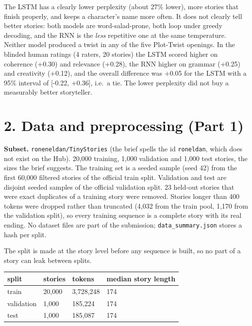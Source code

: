 \documentclass[10pt,a4paper]{article}
\begin{document}
The LSTM has a clearly lower perplexity (about 27\% lower), more stories that finish properly, and keeps a character's
name more often. It does not clearly tell better stories: both models are
word-salad-prone, both loop under greedy decoding, and the RNN is the \emph{less} repetitive one at the same temperature.
Neither model produced a twist in any of the five Plot-Twist openings. In the blinded human ratings (4 raters, 20 stories) the LSTM
scored higher on coherence (+0.30) and relevance (+0.28), the RNN higher on grammar (+0.25) and creativity (+0.12), and the overall difference was +0.05
for the LSTM with a 95\% interval of {[}-0.22, +0.36{]}, i.e.~a tie. The lower perplexity did not buy a measurably better storyteller.

\hypertarget{data-and-preprocessing-part-1}{%
\section{2. Data and preprocessing (Part 1)}\label{data-and-preprocessing-part-1}}

\textbf{Subset.} \texttt{roneneldan/TinyStories} (the brief spells the id \texttt{roneldan}, which does not exist on the Hub).
20,000 training, 1,000 validation and 1,000 test stories, the sizes the brief suggests. The training set is a seeded
sample (seed 42) from the first 60,000 filtered stories of the official train split. Validation and test are disjoint
seeded samples of the official validation split. 23 held-out stories that were exact duplicates of a training story were
removed. Stories longer than 400 tokens were dropped rather than truncated (4,032 from the train pool, 1,170 from the
validation split), so every training sequence is a complete story with its real ending. No dataset files are part of
the submission; \texttt{data\_summary.json} stores a hash per split.

The split is made at the story level before any sequence is built, so no part of a story can leak between splits.

\begin{longtable}[]{@{}llll@{}}
\toprule\noalign{}
split & stories & tokens & median story length \\
\midrule\noalign{}
\endhead
\bottomrule\noalign{}
\endlastfoot
train & 20,000 & 3,728,248 & 174 \\
validation & 1,000 & 185,224 & 174 \\
test & 1,000 & 185,087 & 174 \\
\end{longtable}
\end{document}
